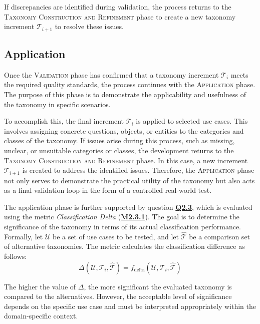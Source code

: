 If discrepancies are identified during validation, the process returns to the \textsc{Taxonomy Construction and Refinement} phase to create a new taxonomy increment $\mathcal{T}_{i+1}$ to resolve these issues.



\subsection{Application}

Once the \textsc{Validation} phase has confirmed that a taxonomy increment $\mathcal{T}_i$ meets the required quality standards, the process continues with the \textsc{Application} phase. The purpose of this phase is to demonstrate the applicability and usefulness of the taxonomy in specific scenarios.

To accomplish this, the final increment $\mathcal{T}_i$ is applied to selected use cases. This involves assigning concrete questions, objects, or entities to the categories and classes of the taxonomy. If issues arise during this process, such as missing, unclear, or unsuitable categories or classes, the development returns to the \textsc{Taxonomy Construction and Refinement} phase. In this case, a new increment $\mathcal{T}_{i+1}$ is created to address the identified issues. Therefore, the \textsc{Application} phase not only serves to demonstrate the practical utility of the taxonomy but also acts as a final validation loop in the form of a controlled real-world test.

The application phase is further supported by question \hyperref[tab:gqm_taxonomy_validation]{\textbf{Q2.3}}, which is evaluated using the metric \emph{Classification Delta} (\hyperref[tab:gqm_taxonomy_validation]{\textbf{M2.3.1}}). The goal is to determine the significance of the taxonomy in terms of its actual classification performance. Formally, let $\mathcal{U}$ be a set of use cases to be tested, and let $\hat{\mathcal{T}}$ be a comparison set of alternative taxonomies. The metric calculates the classification difference as follows:
\[
\Delta(\mathcal{U}, \mathcal{T}_i, \hat{\mathcal{T}}) = f_{\text{delta}}(\mathcal{U}, \mathcal{T}_i, \hat{\mathcal{T}})
\]

The higher the value of $\Delta$, the more significant the evaluated taxonomy is compared to the alternatives. However, the acceptable level of significance depends on the specific use case and must be interpreted appropriately within the domain-specific context.

